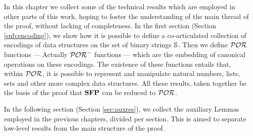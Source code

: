 \label{app}
In this chapter we collect some of the technical results which are
employed in other parts of this work, hoping to foster the understanding
of the main thread of the proof, without lacking of completeness.
%
In the first section (Section \ref{sub:encoding}), we show how it is possible to define a co-articulated
collection of encodings of data structures on the set of binary strings $\mathbb{S}$.
Then we define $\mathcal{POR}$ functions --- Actually {$\mathcal{POR}^-$} functions ---
which are the embedding of canonical operations on these encodings.
%
The existence of these functions entails that, within $\mathcal{POR}$, it is possible
to represent and manipulate natural numbers, lists, sets and other
more complex data structures.
%
All these results, taken together be the basis of the proof that
$\mathbf{SFP}$ can be reduced to $\mathcal{POR}$.

In the following section (Section \ref{sec:auxres}),
we collect the auxiliary Lemmas employed in the previous chapters,
divided per section.
%
This is aimed to separate low-level results from the main
structure of the proof.


